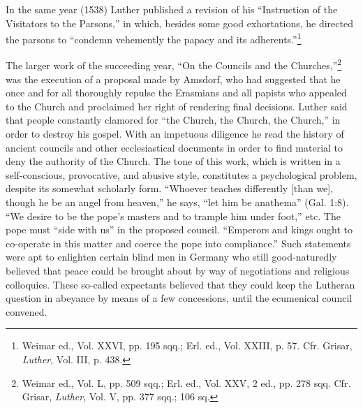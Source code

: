 In the same year (1538) Luther published a revision of his “Instruction
of the Visitators to the Parsons,” in which, besides some good
exhortations, he directed the parsons to “condemn vehemently the
papacy and its adherents.”\footnote
{Weimar ed., Vol. XXVI, pp. 195 sqq.; Erl. ed., Vol. XXIII, p. 57. Cfr. Grisar, \textit{Luther},
Vol. III, p. 438.}

The larger work of the succeeding year, “On the Councils and the
Churches,”\footnote
{Weimar ed., Vol. L, pp. 509 sqq.; Erl. ed., Vol. XXV, 2 ed., pp. 278 sqq. Cfr. Grisar,
\textit{Luther}, Vol. V, pp. 377 sqq.; 106 sq.}
was the execution of a proposal made by Amsdorf, who
had suggested that he once and for all thoroughly repulse the Erasmians
and all papists who appealed to the Church and proclaimed
her right of rendering final decisions. Luther said that people constantly
clamored for “the Church, the Church, the Church,” in order
to destroy his gospel. With an impetuous diligence he read the history
of ancient councils and other ecclesiastical documents in order to find
material to deny the authority of the Church. The tone of this work,
which is written in a self-conscious, provocative, and abusive style,
constitutes a psychological problem, despite its somewhat scholarly
form. “Whoever teaches differently [than we], though he be an
angel from heaven,” he says, “let him be anathema” (Gal. 1:8). “We
desire to be the pope’s masters and to trample him under foot,” etc.
The pope must “side with us” in the proposed council. “Emperors and
kings ought to co-operate in this matter and coerce the pope into
compliance.” Such statements were apt to enlighten certain blind
men in Germany who still good-naturedly believed that peace could
be brought about by way of negotiations and religious colloquies.
These so-called expectants believed that they could keep the Lutheran
question in abeyance by means of a few concessions, until the ecumenical
council convened.

